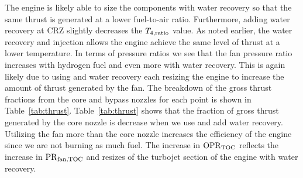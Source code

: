 \documentclass[conf]{new-aiaa}
\begin{document}
The engine is likely able to size the components with water recovery so that the same thrust is generated at a lower fuel-to-air ratio.
Furthermore, adding water recovery at CRZ slightly decreases the $T_{4,\rm{ratio}}$ value.
As noted earlier, the water recovery and injection allows the engine achieve the same level of thrust at a lower temperature.
In terms of pressure ratios we see that the fan pressure ratio increases with hydrogen fuel and even more with water recovery.
This is again likely due to using  and water recovery each resizing the engine to increase the amount of thrust generated by the fan.
The breakdown of the gross thrust fractions from the core and bypass nozzles for each point is shown in Table~\ref{tab:thrust}.
Table~\ref{tab:thrust} shows that the fraction of gross thrust generated by the core nozzle is decrease when we use  and add water recovery.
Utilizing the fan more than the core nozzle increases the efficiency of the engine since we are not burning as much fuel.
The increase in $\rm{OPR}_{\rm{TOC}}$ reflects the increase in $\rm{PR}_{fan,TOC}$ and resizes of the turbojet section of the engine with water recovery.
\end{document}
